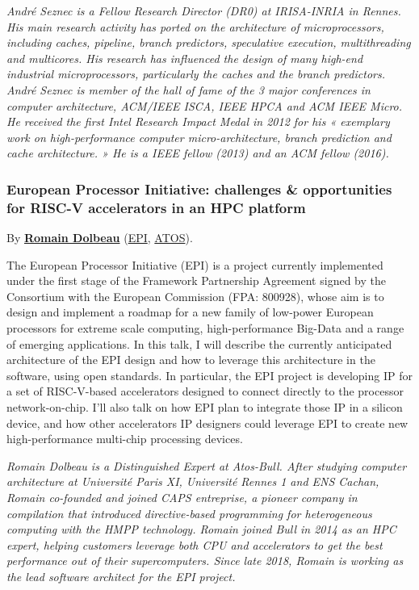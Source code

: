\documentclass[a4paper, 10pt]{article}
\begin{document}
{\emph{\footnotesize André Seznec is a Fellow Research Director (DR0) at IRISA-INRIA in Rennes. His main research activity has ported on the architecture of microprocessors, including caches, pipeline, branch predictors, speculative execution, multithreading and multicores. His research has influenced the design of many high-end industrial microprocessors, particularly the caches and the branch predictors.}
\emph{\footnotesize André Seznec is member of the hall of fame of the 3 major conferences in computer architecture, ACM/IEEE ISCA, IEEE HPCA and ACM IEEE Micro.  He received the first Intel Research Impact Medal in 2012 for his « exemplary work on high-performance computer micro-architecture, branch prediction and cache architecture. » He is a IEEE fellow (2013) and an ACM fellow (2016).}

\subsubsection{European Processor Initiative: challenges \& opportunities for RISC-V accelerators in an HPC platform}
\label{sec:orge116549}
By \textbf{\href{https://fr.linkedin.com/in/romaindolbeau}{Romain Dolbeau}}
(\href{https://www.european-processor-initiative.eu/}{EPI},
\href{https://atos.net}{ATOS}).

The European Processor Initiative (EPI) is a project currently
implemented under the first stage of the Framework Partnership
Agreement signed by the Consortium with the European Commission (FPA:
800928), whose aim is to design and implement a roadmap for a new
family of low-power European processors for extreme scale computing,
high-performance Big-Data and a range of emerging applications.
In this talk, I will describe the currently anticipated architecture
of the EPI design and how to leverage this architecture in the
software, using open standards. In particular, the EPI project is
developing IP for a set of RISC-V-based accelerators designed to
connect directly to the processor network-on-chip. I'll also talk on
how EPI plan to integrate those IP in a silicon device, and how other
accelerators IP designers could leverage EPI to create new
high-performance multi-chip processing devices.

\emph{\footnotesize Romain Dolbeau is a Distinguished Expert at Atos-Bull. After studying computer architecture at Université Paris XI, Université Rennes 1 and ENS Cachan, Romain co-founded and joined CAPS entreprise, a pioneer company in compilation that introduced directive-based programming for heterogeneous computing with the HMPP technology. Romain joined Bull in 2014 as an HPC expert, helping customers leverage both CPU and accelerators to get the best performance out of their supercomputers. Since late 2018, Romain is working as the lead software architect for the EPI project.}

}
\end{document}
